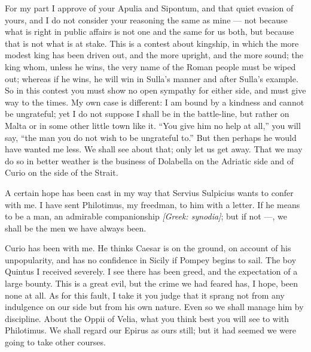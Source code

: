 

 For my part I approve of your Apulia and Sipontum, and that quiet evasion of yours, and I do not consider your reasoning the same as mine --- not because what is right in public affairs is not one and the same for us both, but because that is not what is at stake. This is a contest about kingship, in which the more modest king has been driven out, and the more upright, and the more sound; the king whom, unless he wins, the very name of the Roman people must be wiped out; whereas if he wins, he will win in Sulla's manner and after Sulla's example. So in this contest you must show no open sympathy for either side, and must give way to the times. My own case is different: I am bound by a kindness and cannot be ungrateful; yet I do not suppose I shall be in the battle-line, but rather on Malta or in some other little town like it. ``You give him no help at all,'' you will say, ``the man you do not wish to be ungrateful to.'' But then perhaps he would have wanted me less. We shall see about that; only let us get away. That we may do so in better weather is the business of Dolabella on the Adriatic side and of Curio on the side of the Strait.

 A certain hope has been cast in my way that Servius Sulpicius wants to confer with me. I have sent Philotimus, my freedman, to him with a letter. If he means to be a man, an admirable companionship \textit{[Greek: synodia]}; but if not ---, we shall be the men we have always been.

 Curio has been with me. He thinks Caesar is on the ground, on account of his unpopularity, and has no confidence in Sicily if Pompey begins to sail. The boy Quintus I received severely. I see there has been greed, and the expectation of a large bounty. This is a great evil, but the crime we had feared has, I hope, been none at all. As for this fault, I take it you judge that it sprang not from any indulgence on our side but from his own nature. Even so we shall manage him by discipline. About the Oppii of Velia, what you think best you will see to with Philotimus. We shall regard our Epirus as ours still; but it had seemed we were going to take other courses.
